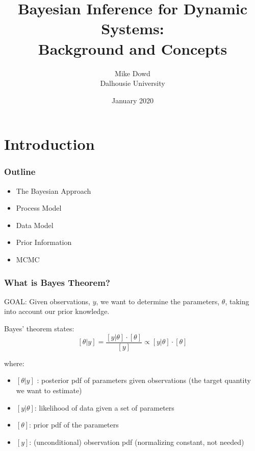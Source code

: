 \documentclass{beamer}
\title{Bayesian Inference for Dynamic Systems: \\
Background and Concepts}
\author{Mike Dowd \\ Dalhousie University}
\date{January 2020}
\begin{document}
\section{Introduction}
\frame{\titlepage}


\frame%
  {\frametitle{Outline}

  

\begin{itemize}
\item The Bayesian Approach
\item Process Model
\item Data Model
\item Prior Information
\item MCMC
\end{itemize}
}


\frame%
{\frametitle{What is Bayes Theorem?}

\medskip
GOAL: Given observations, $y$, we want to determine the parameters, $\theta$, taking into account our prior knowledge.

\pause
\medskip
Bayes' theorem states: 
\[
[\theta | y] =\frac{ [ y | \theta ] \cdot [\theta]}{[y]} \propto [ y | \theta ] \cdot [\theta]
\]

\pause
where:
\begin{itemize}
\item
$[\theta | y]$ : posterior pdf of parameters given observations (the target quantity we want to estimate)
\pause
\item
$[y | \theta]$: likelihood of data given a set of parameters 
\pause
\item
$[\theta]$: prior pdf of the parameters
\pause
\item
$[y]$: (unconditional) observation pdf (normalizing constant, not needed)

\end{itemize}

}
\end{document}
